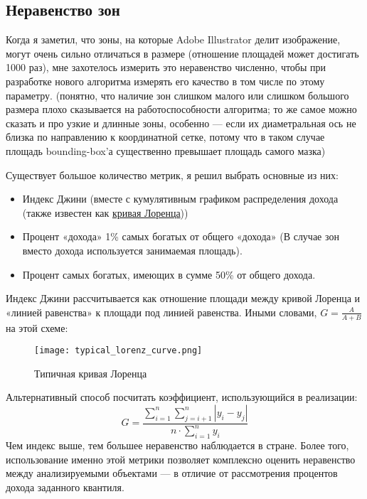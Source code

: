 \subsection{Неравенство зон}\label{subsec:inequality}
Когда я заметил, что зоны, на которые Adobe Illustrator делит изображение, могут очень сильно отличаться в размере (отношение площадей может достигать 1000 раз),
мне захотелось измерить это неравенство численно, чтобы при разработке нового алгоритма измерять его качество в том числе по этому параметру.
(понятно, что наличие зон слишком малого или слишком большого размера плохо сказывается на работоспособности алгоритма;
то же самое можно сказать и про узкие и длинные зоны,
особенно — если их диаметральная ось не близка по направлению к координатной сетке,
потому что в таком случае площадь bounding-box'а существенно превышает площадь самого мазка)

Существует большое количество метрик, я решил выбрать основные из них:
\begin{itemize}
    \item Индекс Джини (вместе с кумулятивным графиком распределения дохода (также известен как \href{https://en.wikipedia.org/wiki/Lorenz_curve}{кривая Лоренца}))
    \item Процент «дохода» 1\% самых богатых от общего «дохода» (В случае зон вместо дохода используется занимаемая площадь).
    \item Процент самых богатых, имеющих в сумме 50\% от общего дохода.
\end{itemize}

Индекс Джини рассчитывается как отношение площади между кривой Лоренца и «линией равенства» к площади под линией равенства.
Иными словами, $G = \frac{A}{A + B}$ на этой схеме:

\begin{figure}[h!]\label{fig:lorenz_curve}
    \centering
    \texttt{[image: typical\_lorenz\_curve.png]}
    \caption{Типичная кривая Лоренца}
\end{figure}
\FloatBarrier

Альтернативный способ посчитать коэффициент, использующийся в реализации:
\begin{equation}
    G = \frac{\sum_{i=1}^{n}  \sum_{j=i+1}^{n}  \left| y_i - y_j \right|}{n \cdot \sum_{i=1}^{n} y_i}
\end{equation}
Чем индекс выше, тем большее неравенство наблюдается в стране.
Более того, использование именно этой метрики позволяет комплексно оценить неравенство между анализируемыми объектами —
в отличие от рассмотрения процентов дохода заданного квантиля.


